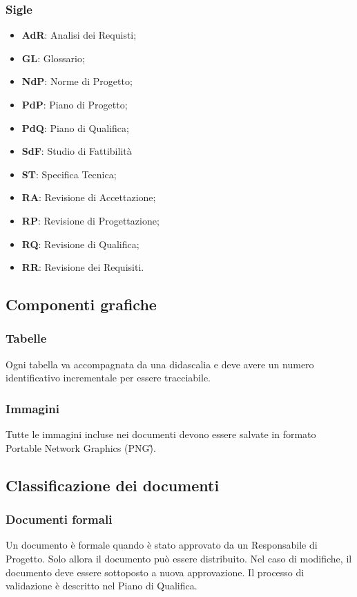 \subsubsection{Sigle}
\begin{itemize}
	\item \textbf{AdR}: Analisi dei Requisti;
	\item \textbf{GL}: Glossario;
	\item \textbf{NdP}: Norme di Progetto;
	\item \textbf{PdP}: Piano di Progetto;
	\item \textbf{PdQ}: Piano di Qualifica;
	\item \textbf{SdF}: Studio di Fattibilità
	\item \textbf{ST}: Specifica Tecnica;
	\item \textbf{RA}: Revisione di Accettazione;
	\item \textbf{RP}: Revisione di Progettazione;
	\item \textbf{RQ}: Revisione di Qualifica;
	\item \textbf{RR}: Revisione dei Requisiti.
\end{itemize}

\subsection{Componenti grafiche}
\subsubsection{Tabelle}
Ogni tabella va accompagnata da una didascalia e deve avere un numero identificativo incrementale per essere tracciabile.

\subsubsection{Immagini}
Tutte le immagini incluse nei documenti devono essere salvate in formato Portable Network Graphics (PNG\G).


\subsection{Classificazione dei documenti}
\subsubsection{Documenti formali}
Un documento è formale quando è stato approvato da un Responsabile di Progetto. Solo allora il documento può essere distribuito. Nel caso di modifiche, il documento deve essere sottoposto a nuova approvazione. Il processo di validazione è descritto nel Piano di Qualifica.

